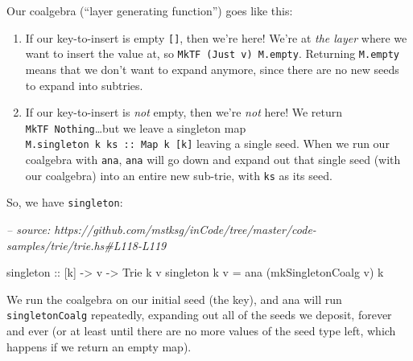 \documentclass[]{article}
\newenvironment{Shaded}{}{}
\newcommand{\CharTok}[1]{\textcolor[rgb]{0.25,0.44,0.63}{#1}}
\newcommand{\CommentTok}[1]{\textcolor[rgb]{0.38,0.63,0.69}{\textit{#1}}}
\newcommand{\DataTypeTok}[1]{\textcolor[rgb]{0.56,0.13,0.00}{#1}}
\newcommand{\DecValTok}[1]{\textcolor[rgb]{0.25,0.63,0.44}{#1}}
\newcommand{\FunctionTok}[1]{\textcolor[rgb]{0.02,0.16,0.49}{#1}}
\newcommand{\NormalTok}[1]{#1}
\newcommand{\OtherTok}[1]{\textcolor[rgb]{0.00,0.44,0.13}{#1}}
\newcommand{\StringTok}[1]{\textcolor[rgb]{0.25,0.44,0.63}{#1}}
\begin{document}
Our coalgebra (``layer generating function'') goes like this:

\begin{enumerate}
\def\labelenumi{\arabic{enumi}.}
\item
  If our key-to-insert is empty \texttt{{[}{]}}, then we're here! We're at
  \emph{the layer} where we want to insert the value at, so
  \texttt{MkTF\ (Just\ v)\ M.empty}. Returning \texttt{M.empty} means that we
  don't want to expand anymore, since there are no new seeds to expand into
  subtries.
\item
  If our key-to-insert is \emph{not} empty, then we're \emph{not} here! We
  return \texttt{MkTF\ Nothing}\ldots{}but we leave a singleton map
  \texttt{M.singleton\ k\ ks\ ::\ Map\ k\ {[}k{]}} leaving a single seed. When
  we run our coalgebra with \texttt{ana}, \texttt{ana} will go down and expand
  out that single seed (with our coalgebra) into an entire new sub-trie, with
  \texttt{ks} as its seed.
\end{enumerate}

So, we have \texttt{singleton}:

\begin{Shaded}
\begin{Highlighting}[]
\CommentTok{-- source: https://github.com/mstksg/inCode/tree/master/code-samples/trie/trie.hs#L118-L119}

\OtherTok{singleton ::}\NormalTok{ [k] }\OtherTok{->}\NormalTok{ v }\OtherTok{->} \DataTypeTok{Trie}\NormalTok{ k v}
\NormalTok{singleton k v }\FunctionTok{=}\NormalTok{ ana (mkSingletonCoalg v) k}
\end{Highlighting}
\end{Shaded}

We run the coalgebra on our initial seed (the key), and ana will run
\texttt{singletonCoalg} repeatedly, expanding out all of the seeds we deposit,
forever and ever (or at least until there are no more values of the seed type
left, which happens if we return an empty map).

\begin{Shaded}
\end{Shaded}
\end{document}
